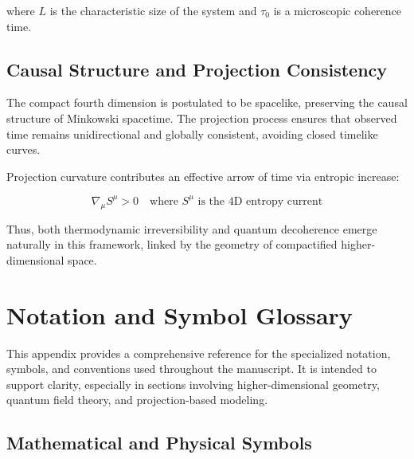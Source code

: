 \documentclass[12pt,a4paper]{article}
\begin{document}
where \(L\) is the characteristic size of the system and \(\tau_0\) is a microscopic coherence time.

\subsection{Causal Structure and Projection Consistency}

The compact fourth dimension is postulated to be spacelike, preserving the causal structure of Minkowski spacetime. The projection process ensures that observed time remains unidirectional and globally consistent, avoiding closed timelike curves.

Projection curvature contributes an effective arrow of time via entropic increase:

\begin{equation}
\nabla_\mu S^\mu > 0 \quad \text{where } S^\mu \text{ is the 4D entropy current}
\end{equation}

Thus, both thermodynamic irreversibility and quantum decoherence emerge naturally in this framework, linked by the geometry of compactified higher-dimensional space.



\section{Notation and Symbol Glossary}
\label{app:notation}

This appendix provides a comprehensive reference for the specialized notation, symbols, and conventions used throughout the manuscript. It is intended to support clarity, especially in sections involving higher-dimensional geometry, quantum field theory, and projection-based modeling.

\subsection*{Mathematical and Physical Symbols}
\end{document}
